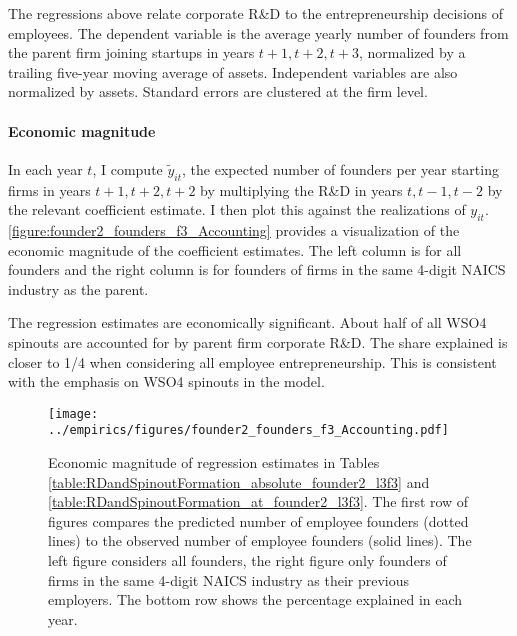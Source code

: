 \documentclass[11pt,english]{article}
\begin{document}
\begin{table}[!htb]
	\scriptsize
	\centering
	
	\caption{The regressions above relate corporate R\&D to the entrepreneurship decisions of employees. The dependent variable is the average yearly number of founders from the parent firm joining startups in years $t+1,t+2,t+3$, normalized by a trailing five-year moving average of assets. Independent variables are also normalized by assets. Standard errors are clustered at the firm level.}
	\label{table:RDandSpinoutFormation_at_founder2_l3f3}
\end{table}

\paragraph{Economic magnitude}

In each year $t$, I compute $\tilde{y}_{it}$, the expected number of founders per year starting firms in years $t+1,t+2,t+2$ by multiplying the R\&D in years $t,t-1,t-2$ by the relevant coefficient estimate. I then plot this against the realizations of $y_{it}$. \autoref{figure:founder2_founders_f3_Accounting} provides a visualization of the economic magnitude of the coefficient estimates. The left column is for all founders and the right column is for founders of firms in the same 4-digit NAICS industry as the parent. 

The regression estimates are economically significant. About half of all WSO4 spinouts are accounted for by parent firm corporate R\&D. The share explained is closer to 1/4 when considering all employee entrepreneurship. This is consistent with the emphasis on WSO4 spinouts in the model. 

\begin{figure}[!htb]
	\texttt{[image: ../empirics/figures/founder2\_founders\_f3\_Accounting.pdf]}
	\caption{Economic magnitude of regression estimates in Tables \ref{table:RDandSpinoutFormation_absolute_founder2_l3f3} and \ref{table:RDandSpinoutFormation_at_founder2_l3f3}. The first row of figures compares the predicted number of employee founders (dotted lines) to the observed number of employee founders (solid lines). The left figure considers all founders, the right figure only founders of firms in the same 4-digit NAICS industry as their previous employers. The bottom row shows the percentage explained in each year.}
	\label{figure:founder2_founders_f3_Accounting}
\end{figure}
\end{document}
